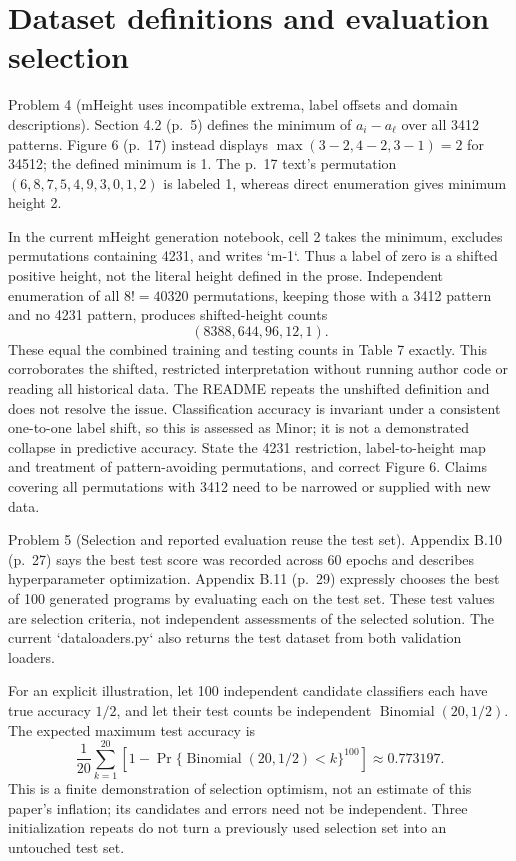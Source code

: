 \documentclass[10pt]{article}
\begin{document}
\section*{Dataset definitions and evaluation selection}
Problem 4 (mHeight uses incompatible extrema, label offsets and domain descriptions).  Section 4.2 (p. 5) defines the minimum of \(a_i-a_\ell\) over all 3412 patterns. Figure 6 (p. 17) instead displays \(\max(3-2,4-2,3-1)=2\) for 34512; the defined minimum is 1. The p. 17 text’s permutation \((6,8,7,5,4,9,3,0,1,2)\) is labeled 1, whereas direct enumeration gives minimum height 2.\par
In the current mHeight generation notebook, cell 2 takes the minimum, excludes permutations containing 4231, and writes `m-1`. Thus a label of zero is a shifted positive height, not the literal height defined in the prose. Independent enumeration of all \(8!=40320\) permutations, keeping those with a 3412 pattern and no 4231 pattern, produces shifted-height counts \[(8388,644,96,12,1).\] These equal the combined training and testing counts in Table 7 exactly. This corroborates the shifted, restricted interpretation without running author code or reading all historical data. The README repeats the unshifted definition and does not resolve the issue. Classification accuracy is invariant under a consistent one-to-one label shift, so this is assessed as Minor; it is not a demonstrated collapse in predictive accuracy. State the 4231 restriction, label-to-height map and treatment of pattern-avoiding permutations, and correct Figure 6. Claims covering all permutations with 3412 need to be narrowed or supplied with new data.\par
Problem 5 (Selection and reported evaluation reuse the test set).  Appendix B.10 (p. 27) says the best test score was recorded across 60 epochs and describes hyperparameter optimization. Appendix B.11 (p. 29) expressly chooses the best of 100 generated programs by evaluating each on the test set. These test values are selection criteria, not independent assessments of the selected solution. The current `dataloaders.py` also returns the test dataset from both validation loaders.\par
For an explicit illustration, let 100 independent candidate classifiers each have true accuracy \(1/2\), and let their test counts be independent \(\operatorname{Binomial}(20,1/2)\). The expected maximum test accuracy is \[\frac1{20}\sum_{k=1}^{20}\left[1-\Pr\{\operatorname{Binomial}(20,1/2)<k\}^{100}\right]
 \approx0.773197.\] This is a finite demonstration of selection optimism, not an estimate of this paper’s inflation; its candidates and errors need not be independent. Three initialization repeats do not turn a previously used selection set into an untouched test set.\par
\end{document}

